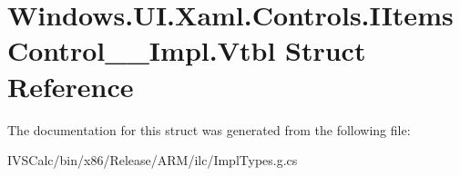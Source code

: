 \hypertarget{struct_windows_1_1_u_i_1_1_xaml_1_1_controls_1_1_i_items_control_____impl_1_1_vtbl}{}\section{Windows.\+U\+I.\+Xaml.\+Controls.\+I\+Items\+Control\+\_\+\+\_\+\+Impl.\+Vtbl Struct Reference}
\label{struct_windows_1_1_u_i_1_1_xaml_1_1_controls_1_1_i_items_control_____impl_1_1_vtbl}


The documentation for this struct was generated from the following file\+:\begin{DoxyCompactItemize}
\item 
I\+V\+S\+Calc/bin/x86/\+Release/\+A\+R\+M/ilc/Impl\+Types.\+g.\+cs\end{DoxyCompactItemize}

